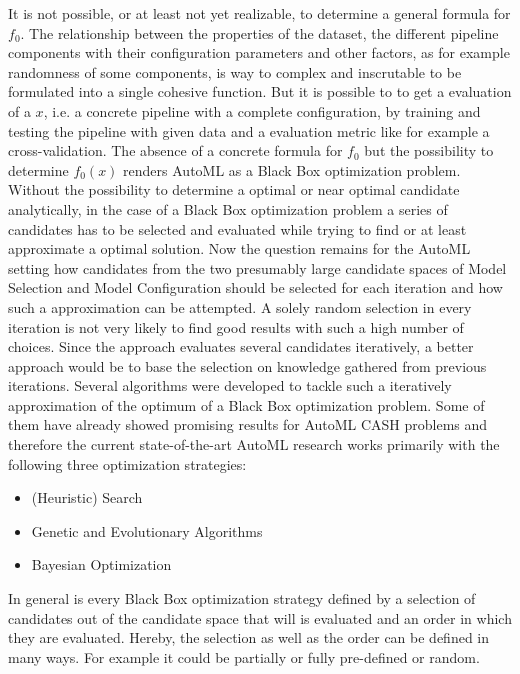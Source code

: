 It is not possible, or at least not yet realizable, to determine a general formula for $f_0$.
The relationship between the properties of the dataset, the different pipeline components with their configuration parameters and other factors, as for example randomness of some components, is way to complex and inscrutable to be formulated into a single cohesive function.
But it is possible to to get a evaluation of a $x$, i.e. a concrete pipeline with a complete configuration, by training and testing the pipeline with given data and a evaluation metric like for example a cross-validation.
The absence of a concrete formula for $f_0$ but the possibility to determine $f_0(x)$ renders AutoML as a Black Box optimization problem.\newline
Without the possibility to determine a optimal or near optimal candidate analytically, in the case of a Black Box optimization problem a series of candidates has to be selected and evaluated while trying to find or at least approximate a optimal solution.
Now the question remains for the AutoML setting how candidates from the two presumably large candidate spaces of Model Selection and Model Configuration should be selected for each iteration and how such a approximation can be attempted.\newline
A solely random selection in every iteration is not very likely to find good results with such a high number of choices.
Since the approach evaluates several candidates iteratively, a better approach would be to base the selection on knowledge gathered from previous iterations.\newline
Several algorithms were developed to tackle such a iteratively approximation of the optimum of a Black Box optimization problem.
Some of them have already showed promising results for AutoML CASH problems and therefore the current state-of-the-art AutoML research works primarily with the following three optimization strategies:
\begin{itemize}
    \item (Heuristic) Search
    \item Genetic and Evolutionary Algorithms
    \item Bayesian Optimization
\end{itemize}
In general is every Black Box optimization strategy defined by a selection of candidates out of the candidate space that will is evaluated and an order in which they are evaluated.
Hereby, the selection as well as the order can be defined in many ways.
For example it could be partially or fully pre-defined or random.
